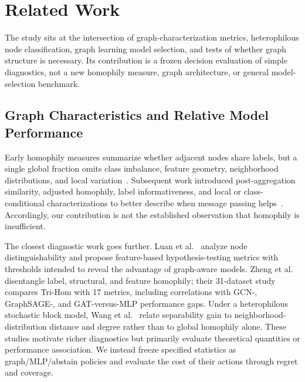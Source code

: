 
\section{Related Work}
\label{sec:related}

The study sits at the intersection of graph-characterization metrics, heterophilous node classification, graph learning model selection, and tests of whether graph structure is necessary. Its contribution is a frozen decision evaluation of simple diagnostics, not a new homophily measure, graph architecture, or general model-selection benchmark.

\subsection{Graph Characteristics and Relative Model Performance}

Early homophily measures summarize whether adjacent nodes share labels, but a single global fraction omits class imbalance, feature geometry, neighborhood distributions, and local variation~\cite{mcpherson2001homophily,zhu2020beyond,ma2021homophily}. Subsequent work introduced post-aggregation similarity, adjusted homophily, label informativeness, and local or class-conditional characterizations to better describe when message passing helps~\cite{luan2022linkx,platonov2023characterizing,loveland2024local}. Accordingly, our contribution is not the established observation that homophily is insufficient.

The closest diagnostic work goes further. Luan et al.~\cite{luan2023whendo} analyze node distinguishability and propose feature-based hypothesis-testing metrics with thresholds intended to reveal the advantage of graph-aware models. Zheng et al.~\cite{zheng2024trihom} disentangle label, structural, and feature homophily; their 31-dataset study compares Tri-Hom with 17 metrics, including correlations with GCN-, GraphSAGE-, and GAT-versus-MLP performance gaps. Under a heterophilous stochastic block model, Wang et al.~\cite{pmlr-v235-wang24u} relate separability gain to neighborhood-distribution distance and degree rather than to global homophily alone. These studies motivate richer diagnostics but primarily evaluate theoretical quantities or performance association. We instead freeze specified statistics as graph/MLP/abstain policies and evaluate the cost of their actions through regret and coverage.

